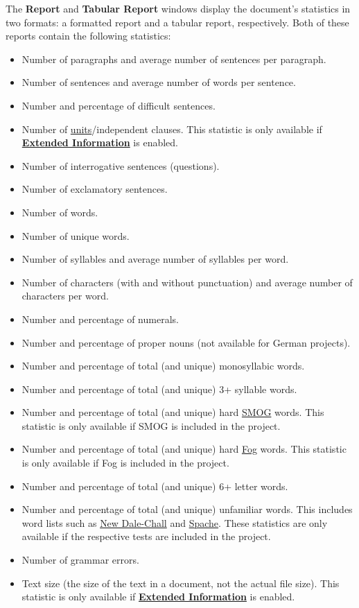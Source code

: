 \documentclass[
]{book}
\providecommand{\tightlist}{%
  \setlength{\itemsep}{0pt}\setlength{\parskip}{0pt}}
\theoremstyle{definition}
\theoremstyle{definition}
\theoremstyle{definition}
\theoremstyle{definition}
\theoremstyle{remark}
\begin{document}
The \textbf{Report} and \textbf{Tabular Report} windows display the document's statistics in two formats: a formatted report and a tabular report, respectively. Both of these reports contain the following statistics:

\begin{itemize}
\tightlist
\item
  Number of paragraphs and average number of sentences per paragraph.
\item
  Number of sentences and average number of words per sentence.
\item
  Number and percentage of difficult sentences.
\item
  Number of \protect\hyperlink{glossary}{units}/independent clauses. This statistic is only available if \protect\hyperlink{options-summary-report}{\textbf{Extended Information}} is enabled.
\item
  Number of interrogative sentences (questions).
\item
  Number of exclamatory sentences.
\item
  Number of words.
\item
  Number of unique words.
\item
  Number of syllables and average number of syllables per word.
\item
  Number of characters (with and without punctuation) and average number of characters per word.
\item
  Number and percentage of numerals.
\item
  Number and percentage of proper nouns (not available for German projects).
\item
  Number and percentage of total (and unique) monosyllabic words.
\item
  Number and percentage of total (and unique) 3+ syllable words.
\item
  Number and percentage of total (and unique) hard \protect\hyperlink{smog-test}{SMOG} words. This statistic is only available if SMOG is included in the project.
\item
  Number and percentage of total (and unique) hard \protect\hyperlink{gunning-fog-test}{Fog} words. This statistic is only available if Fog is included in the project.
\item
  Number and percentage of total (and unique) 6+ letter words.
\item
  Number and percentage of total (and unique) unfamiliar words. This includes word lists such as \protect\hyperlink{dale-chall-test}{New Dale-Chall} and \protect\hyperlink{spache-test}{Spache}. These statistics are only available if the respective tests are included in the project.
\item
  Number of grammar errors.
\item
  Text size (the size of the text in a document, not the actual file size). This statistic is only available if \protect\hyperlink{options-summary-report}{\textbf{Extended Information}} is enabled.
\end{itemize}
\end{document}
